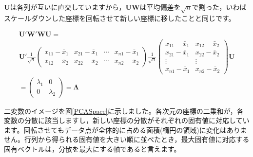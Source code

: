 \documentclass{ltjsbook}
\begin{document}
$\bm{U}$は各列が互いに直交していますから，$\bm{UW}$は平均偏差を$\sqrt{n}$で割った，いわばスケールダウンした座標を回転させて新しい座標に移したことと同じです。

\[\begin{array}{l}
		\bm{U}'\bm{W}'\bm{WU} =                                  \\
		\bm{U}' \frac{1}{\sqrt{n}}
		\begin{pmatrix} x_{11} - \bar{x}_1 & x_{21}-\bar{x}_1 & \cdots & x_{n1}-\bar{x}_1 \\
                x_{12} - \bar{x}_2 & x_{22}-\bar{x}_2 & \cdots & x_{n2}-\bar{x}_2\end{pmatrix}
		\frac{1}{\sqrt{n}}
		\begin{pmatrix} x_{11} - \bar{x}_1 & x_{12}-\bar{x}_2 \\
                x_{21} - \bar{x}_1 & x_{22}-\bar{x}_2 \\
                \vdots             & \vdots           \\
                x_{n1} - \bar{x}_1 & x_{n2}-\bar{x}_2\end{pmatrix}\bm{U} \\
		=
		\begin{pmatrix}\lambda_1 & 0 \\ 0 & \lambda_2 \end{pmatrix} = \bm{\Lambda}
	\end{array}
\]

二変数のイメージを図\ref{PCASpace}に示しました。各次元の座標の二乗和が，各変数の分散に該当しますし，新しい座標の分散がそれぞれの固有値に対応しています。回転させてもデータ点が全体的に占める面積(楕円の領域)に変化はありません。行列から得られる固有値を大きい順に並べたとき，最大固有値に対応する固有ベクトルは，分散を最大にする軸であると言えます。
\end{document}
